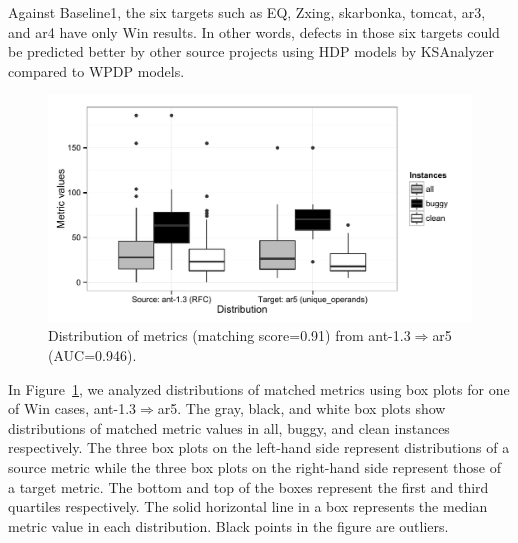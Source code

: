 
Against Baseline1, the six targets such as EQ, Zxing, skarbonka, tomcat,
ar3, and ar4 have only Win results. In other words, defects in those six targets
could be predicted better by other source projects using HDP models by
KSAnalyzer compared to WPDP models.

\label{sec:why}
\begin{figure}[t]
	\centering
	\includegraphics[width=\linewidth]{Figures/Result/best_dist_bplot.pdf}
	\caption{Distribution of metrics (matching score=0.91)
	from ant-1.3$\Rightarrow$ar5 (AUC=0.946).}
	\label{fig:best_dist}
\end{figure}

In Figure~\ref{fig:best_dist}, we analyzed distributions of matched metrics using box plots for one of Win cases, ant-1.3$\Rightarrow$ar5. 
The gray, black, and white box plots show distributions of matched metric values in
all, buggy, and clean instances respectively. The three box plots on the
left-hand side represent distributions of a source metric while the three
box plots on the right-hand side represent those of a target metric. The
bottom and top of the boxes represent the first and third quartiles
respectively.
The solid horizontal line in a box represents the median metric value in each distribution. 
Black points in the figure are outliers.

